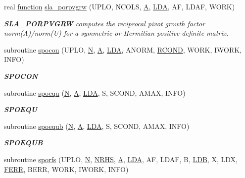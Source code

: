 \begin{DoxyCompactItemize}
real \hyperlink{afunc_8m_a7b5e596df91eadea6c537c0825e894a7}{function} \hyperlink{group__realPOcomputational_gadcdec581bf34c8535f2813adc33ed631}{sla\+\_\+porpvgrw} (U\+P\+L\+O, N\+C\+O\+L\+S, \hyperlink{classA}{A}, \hyperlink{example__user_8c_ae946da542ce0db94dced19b2ecefd1aa}{L\+D\+A}, A\+F, L\+D\+A\+F, W\+O\+R\+K)
\begin{DoxyCompactList}\small\item\em {\bfseries S\+L\+A\+\_\+\+P\+O\+R\+P\+V\+G\+R\+W} computes the reciprocal pivot growth factor norm(\+A)/norm(U) for a symmetric or Hermitian positive-\/definite matrix. \end{DoxyCompactList}\item 
subroutine \hyperlink{group__realPOcomputational_gaca094dd6ef3db9ecb580ea731ecb5365}{spocon} (U\+P\+L\+O, \hyperlink{polmisc_8c_a0240ac851181b84ac374872dc5434ee4}{N}, \hyperlink{classA}{A}, \hyperlink{example__user_8c_ae946da542ce0db94dced19b2ecefd1aa}{L\+D\+A}, A\+N\+O\+R\+M, \hyperlink{superlu__enum__consts_8h_af00a42ecad444bbda75cde1b64bd7e72a9b5c151728d8512307565994c89919d5}{R\+C\+O\+N\+D}, W\+O\+R\+K, I\+W\+O\+R\+K, I\+N\+F\+O)
\begin{DoxyCompactList}\small\item\em {\bfseries S\+P\+O\+C\+O\+N} \end{DoxyCompactList}\item 
subroutine \hyperlink{group__realPOcomputational_gaea93f7525cdea32854b20ed0bddfc885}{spoequ} (\hyperlink{polmisc_8c_a0240ac851181b84ac374872dc5434ee4}{N}, \hyperlink{classA}{A}, \hyperlink{example__user_8c_ae946da542ce0db94dced19b2ecefd1aa}{L\+D\+A}, S, S\+C\+O\+N\+D, A\+M\+A\+X, I\+N\+F\+O)
\begin{DoxyCompactList}\small\item\em {\bfseries S\+P\+O\+E\+Q\+U} \end{DoxyCompactList}\item 
subroutine \hyperlink{group__realPOcomputational_gafe38c1fc8fe05c782f06f59157bdc389}{spoequb} (\hyperlink{polmisc_8c_a0240ac851181b84ac374872dc5434ee4}{N}, \hyperlink{classA}{A}, \hyperlink{example__user_8c_ae946da542ce0db94dced19b2ecefd1aa}{L\+D\+A}, S, S\+C\+O\+N\+D, A\+M\+A\+X, I\+N\+F\+O)
\begin{DoxyCompactList}\small\item\em {\bfseries S\+P\+O\+E\+Q\+U\+B} \end{DoxyCompactList}\item 
subroutine \hyperlink{group__realPOcomputational_gae4835582211ebddde1f5882c67561d97}{sporfs} (U\+P\+L\+O, \hyperlink{polmisc_8c_a0240ac851181b84ac374872dc5434ee4}{N}, \hyperlink{example__user_8c_aa0138da002ce2a90360df2f521eb3198}{N\+R\+H\+S}, \hyperlink{classA}{A}, \hyperlink{example__user_8c_ae946da542ce0db94dced19b2ecefd1aa}{L\+D\+A}, A\+F, L\+D\+A\+F, B, \hyperlink{example__user_8c_a50e90a7104df172b5a89a06c47fcca04}{L\+D\+B}, X, L\+D\+X, \hyperlink{superlu__enum__consts_8h_af00a42ecad444bbda75cde1b64bd7e72a78fd14d7abebae04095cfbe02928f153}{F\+E\+R\+R}, B\+E\+R\+R, W\+O\+R\+K, I\+W\+O\+R\+K, I\+N\+F\+O)

\end{DoxyCompactItemize}
